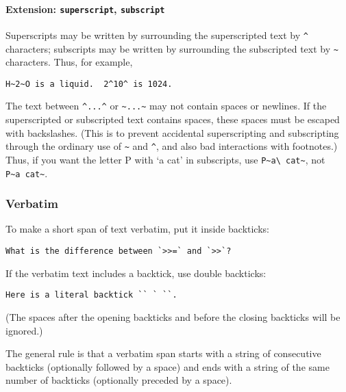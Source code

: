 \documentclass[
  a4paper,
]{article}
\begin{document}
\hypertarget{extension-superscript-subscript}{%
\paragraph{\texorpdfstring{Extension: \texttt{superscript},
\texttt{subscript}}{Extension: superscript, subscript}}\label{extension-superscript-subscript}}

Superscripts may be written by surrounding the superscripted text by
\texttt{\^{}} characters; subscripts may be written by surrounding the
subscripted text by \texttt{\textasciitilde{}} characters. Thus, for
example,

\begin{verbatim}
H~2~O is a liquid.  2^10^ is 1024.
\end{verbatim}

The text between \texttt{\^{}...\^{}} or
\texttt{\textasciitilde{}...\textasciitilde{}} may not contain spaces or
newlines. If the superscripted or subscripted text contains spaces,
these spaces must be escaped with backslashes. (This is to prevent
accidental superscripting and subscripting through the ordinary use of
\texttt{\textasciitilde{}} and \texttt{\^{}}, and also bad interactions
with footnotes.) Thus, if you want the letter P with `a cat' in
subscripts, use
\texttt{P\textasciitilde{}a\textbackslash{}\ cat\textasciitilde{}}, not
\texttt{P\textasciitilde{}a\ cat\textasciitilde{}}.

\hypertarget{verbatim}{%
\subsubsection{Verbatim}\label{verbatim}}

To make a short span of text verbatim, put it inside backticks:

\begin{verbatim}
What is the difference between `>>=` and `>>`?
\end{verbatim}

If the verbatim text includes a backtick, use double backticks:

\begin{verbatim}
Here is a literal backtick `` ` ``.
\end{verbatim}

(The spaces after the opening backticks and before the closing backticks
will be ignored.)

The general rule is that a verbatim span starts with a string of
consecutive backticks (optionally followed by a space) and ends with a
string of the same number of backticks (optionally preceded by a space).
\end{document}
